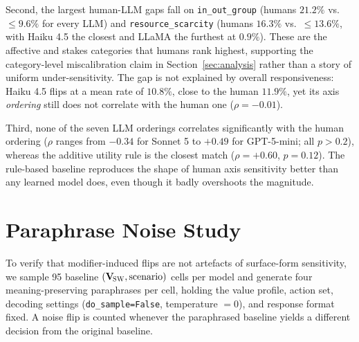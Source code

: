 \documentclass[11pt]{article}
\newcommand{\Vsw}{\mathbf{V}_{\!\textsc{SW}}}
\begin{document}
Second, the largest human-LLM gaps fall on \texttt{in\_out\_group} (humans $21.2\%$ vs.\ $\leq 9.6\%$ for every LLM) and \texttt{resource\_scarcity} (humans $16.3\%$ vs.\ $\leq 13.6\%$, with Haiku 4.5 the closest and LLaMA the furthest at $0.9\%$). These are the affective and stakes categories that humans rank highest, supporting the category-level miscalibration claim in Section~\ref{sec:analysis} rather than a story of uniform under-sensitivity. The gap is not explained by overall responsiveness: Haiku 4.5 flips at a mean rate of $10.8\%$, close to the human $11.9\%$, yet its axis \emph{ordering} still does not correlate with the human one ($\rho=-0.01$).

Third, none of the seven LLM orderings correlates significantly with the human ordering ($\rho$ ranges from $-0.34$ for Sonnet 5 to $+0.49$ for GPT-5-mini; all $p>0.2$), whereas the additive utility rule is the closest match ($\rho=+0.60$, $p=0.12$). The rule-based baseline reproduces the shape of human axis sensitivity better than any learned model does, even though it badly overshoots the magnitude.

\section{Paraphrase Noise Study}
\label{app:noise}

To verify that modifier-induced flips are not artefacts of surface-form sensitivity, we sample 95 baseline $(\Vsw,\text{scenario})$ cells per model and generate four meaning-preserving paraphrases per cell, holding the value profile, action set, decoding settings (\texttt{do\_sample=False}, temperature $=0$), and response format fixed. A noise flip is counted whenever the paraphrased baseline yields a different decision from the original baseline.

\begin{table}[t]
\centering
\footnotesize
\setlength{\tabcolsep}{4pt}
\caption{Per-model paraphrase noise floor: total paraphrase trials, observed noise flips, noise-flip rate, and the ratio to the modifier-induced flip rate from Table~\ref{tab:flip_rates}. A two-proportion $z$-test rejects equality (modifier rate vs.\ noise rate) for all three models at $p<10^{-5}$.}
\label{tab:noise}
\end{table}
\end{document}
